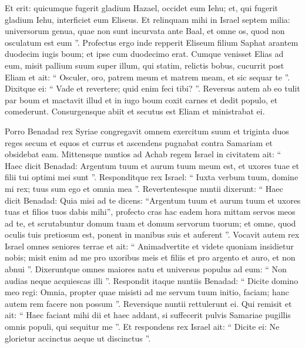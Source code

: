 \begin{biblechapter}
\begin{biblechapter}
\begin{biblechapter}
\begin{biblechapter}
\begin{biblechapter}
\begin{biblechapter}
\begin{biblechapter}
\begin{biblechapter}
\begin{biblechapter}
\begin{biblechapter}
\begin{biblechapter}
\begin{biblechapter}
\begin{biblechapter}
\begin{biblechapter}
\begin{biblechapter}
\begin{biblechapter}
\begin{biblechapter}
\begin{biblechapter}
\begin{biblechapter}
\verse Et erit: quicumque fugerit gladium Hazael, occidet eum Iehu; et, qui fugerit gladium Iehu, interficiet eum Eliseus. 
\verse Et relinquam mihi in Israel septem milia: universorum genua, quae non sunt incurvata ante Baal, et omne os, quod non osculatum est eum ”.
 \verse Profectus ergo inde repperit Eliseum filium Saphat arantem duodecim iugis boum; et ipse cum duodecimo erat. Cumque venisset Elias ad eum, misit pallium suum super illum, 
\verse qui statim, relictis bobus, cucurrit post Eliam et ait: “ Osculer, oro, patrem meum et matrem meam, et sic sequar te ”. Dixitque ei: “ Vade et revertere; quid enim feci tibi? ”.
 \verse Reversus autem ab eo tulit par boum et mactavit illud et in iugo boum coxit carnes et dedit populo, et comederunt. Consurgensque abiit et secutus est Eliam et ministrabat ei.
 
\begin{biblechapter}
\verse Porro Benadad rex Syriae congregavit omnem exercitum suum et triginta duos reges secum et equos et currus et ascendens pugnabat contra Samariam et obsidebat eam. 
\verse Mittensque nuntios ad Achab regem Israel in civitatem 
\verse ait: “ Haec dicit Benadad: Argentum tuum et aurum tuum meum est, et uxores tuae et filii tui optimi mei sunt ”. 
\verse Responditque rex Israel: “ Iuxta verbum tuum, domine mi rex; tuus sum ego et omnia mea ”. 
\verse Revertentesque nuntii dixerunt: “ Haec dicit Benadad: Quia misi ad te dicens: “Argentum tuum et aurum tuum et uxores tuas et filios tuos dabis mihi”, 
\verse profecto cras hac eadem hora mittam servos meos ad te, et scrutabuntur domum tuam et domum servorum tuorum; et omne, quod oculis tuis pretiosum est, ponent in manibus suis et auferent ”.
 \verse Vocavit autem rex Israel omnes seniores terrae et ait: “ Animadvertite et videte quoniam insidietur nobis; misit enim ad me pro uxoribus meis et filiis et pro argento et auro, et non abnui ”. 
\verse Dixeruntque omnes maiores natu et universus populus ad eum: “ Non audias neque acquiescas illi ”. 
\verse Respondit itaque nuntiis Benadad: “ Dicite domino meo regi: Omnia, propter quae misisti ad me servum tuum initio, faciam; hanc autem rem facere non possum ”. Reversique nuntii rettulerunt ei. 
\verse Qui remisit et ait: “ Haec faciant mihi dii et haec addant, si suffecerit pulvis Samariae pugillis omnis populi, qui sequitur me ”. 
\verse Et respondens rex Israel ait: “ Dicite ei: Ne glorietur accinctus aeque ut discinctus ”. 

\end{biblechapter}
\end{biblechapter}
\end{biblechapter}
\end{biblechapter}
\end{biblechapter}
\end{biblechapter}
\end{biblechapter}
\end{biblechapter}
\end{biblechapter}
\end{biblechapter}
\end{biblechapter}
\end{biblechapter}
\end{biblechapter}
\end{biblechapter}
\end{biblechapter}
\end{biblechapter}
\end{biblechapter}
\end{biblechapter}
\end{biblechapter}
\end{biblechapter}
